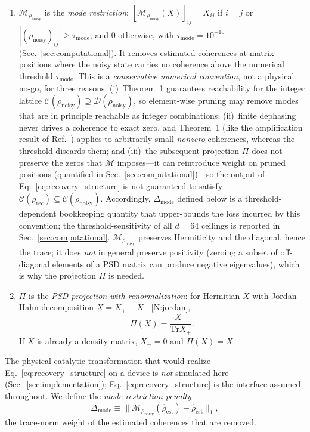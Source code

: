 \documentclass[pra,twocolumn,superscriptaddress,longbibliography,floatfix,nofootinbib]{revtex4-2}
\newcommand{\CC}{\mathcal{C}}
\newcommand{\DD}{\mathcal{D}}
\newcommand{\tr}{\mathrm{Tr}}
\newcommand{\rhon}{\rho_\mathrm{noisy}}
\newcommand{\rhor}{\rho_\mathrm{rec}}
\newcommand{\rhoe}{\hat{\rho}_\mathrm{est}}
\begin{document}
\begin{enumerate}[label=(D\arabic*),leftmargin=3em]
\item \label{D:M} $\mathcal{M}_{\rhon}$ is the \emph{mode restriction}: $[\mathcal{M}_{\rhon}(X)]_{ij} = X_{ij}$ if $i = j$ or $|(\rhon)_{ij}| \geq \tau_\mathrm{mode}$, and $0$ otherwise, with $\tau_\mathrm{mode} = 10^{-10}$ (Sec.~\ref{sec:computational}).
It removes estimated coherences at matrix positions where the noisy state carries no coherence above the numerical threshold $\tau_\mathrm{mode}$. This is a \emph{conservative numerical convention}, not a physical no-go, for three reasons: (i)~Theorem~1 guarantees reachability for the integer lattice $\CC(\rhon) \supseteq \DD(\rhon)$, so element-wise pruning may remove modes that are in principle reachable as integer combinations; (ii)~finite dephasing never drives a coherence to exact zero, and Theorem~1 (like the amplification result of Ref.~\cite{Shiraishi2024}) applies to arbitrarily small \emph{nonzero} coherences, whereas the threshold discards them; and (iii)~the subsequent projection $\Pi$ does not preserve the zeros that $\mathcal{M}$ imposes---it can reintroduce weight on pruned positions (quantified in Sec.~\ref{sec:computational})---so the output of Eq.~\eqref{eq:recovery_structure} is not guaranteed to satisfy $\CC(\rhor) \subseteq \CC(\rhon)$. Accordingly, $\Delta_\mathrm{mode}$ defined below is a threshold-dependent bookkeeping quantity that upper-bounds the loss incurred by this convention; the threshold-sensitivity of all $d = 64$ ceilings is reported in Sec.~\ref{sec:computational}.
$\mathcal{M}_{\rhon}$ preserves Hermiticity and the diagonal, hence the trace; it does \emph{not} in general preserve positivity (zeroing a subset of off-diagonal elements of a PSD matrix can produce negative eigenvalues), which is why the projection $\Pi$ is needed.
\item \label{D:Pi} $\Pi$ is the \emph{PSD projection with renormalization}: for Hermitian $X$ with Jordan--Hahn decomposition $X = X_+ - X_-$ \ref{N:jordan},
\begin{equation}
\Pi(X) = \frac{X_+}{\tr X_+}.
\label{eq:psd_proj}
\end{equation}
If $X$ is already a density matrix, $X_- = 0$ and $\Pi(X) = X$.
\end{enumerate}
The physical catalytic transformation that would realize Eq.~\eqref{eq:recovery_structure} on a device is \emph{not} simulated here (Sec.~\ref{sec:implementation}); Eq.~\eqref{eq:recovery_structure} is the interface assumed throughout.
We define the \emph{mode-restriction penalty}
\begin{equation}
\Delta_{\mathrm{mode}} \equiv \bigl\|\mathcal{M}_{\rhon}(\rhoe) - \rhoe\bigr\|_1 ,
\label{eq:delta_mode}
\end{equation}
the trace-norm weight of the estimated coherences that are removed.
\end{document}
